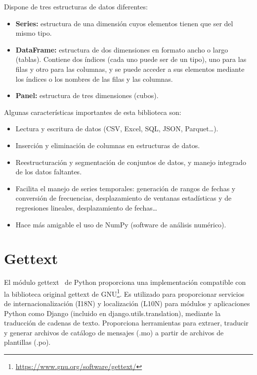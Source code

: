 \documentclass[a4paper, 12pt]{book}
\begin{document}
Dispone de tres estructuras de datos diferentes:
\begin{itemize}
    \item \textbf{Series: } estructura de una dimensión cuyos elementos tienen que ser del mismo tipo.
    \item \textbf{DataFrame: } estructura de dos dimensiones en formato ancho o largo (tablas).
    Contiene dos índices (cada uno puede ser de un tipo), uno para las filas y otro para las columnas, y se puede acceder a sus elementos mediante los índices o los nombres de las filas y las columnas.
    \item \textbf{Panel: } estructura de tres dimensiones (cubos).
\end{itemize}

\vspace{5mm}
Algunas características importantes de esta biblioteca son:
\begin{itemize}
    \item Lectura y escritura de datos (CSV, Excel, SQL, JSON, Parquet\ldots).
    \item Inserción y eliminación de columnas en estructuras de datos.
    \item Reestructuración y segmentación de conjuntos de datos, y manejo integrado de los datos faltantes.
    \item Facilita el manejo de series temporales: generación de rangos de fechas y conversión de frecuencias, desplazamiento de ventanas estadísticas y de regresiones lineales, desplazamiento de fechas…
    \item Hace más amigable el uso de NumPy (software de análisis numérico).
\end{itemize}

\newpage
\section{Gettext} 
\label{sec:gettext}

El módulo gettext~\cite{Gettext} de Python proporciona una implementación compatible con la biblioteca original gettext de GNU\footnote{\url{https://www.gnu.org/software/gettext/}}. 
Es utilizado para proporcionar servicios de internacionalización (I18N) y localización (L10N) para módulos y aplicaciones Python como Django (incluido en django.utils.translation), mediante la traducción de cadenas de texto.
Proporciona herramientas para extraer, traducir y generar archivos de catálogo de mensajes (.mo) a partir de archivos de plantillas (.po).
\end{document}
